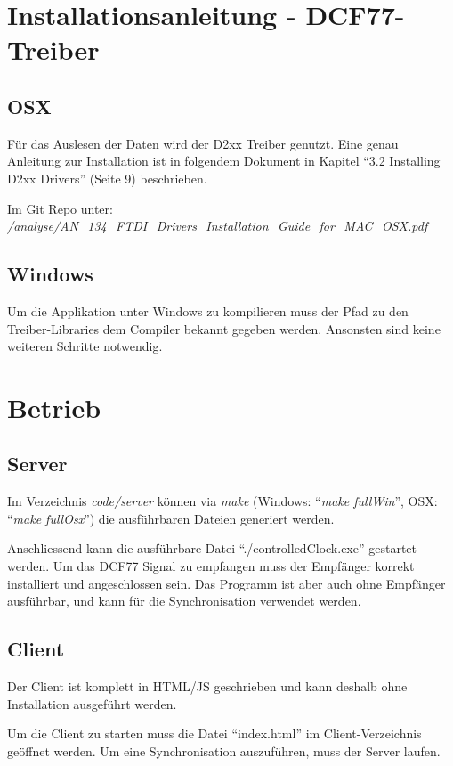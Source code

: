 \section{Installationsanleitung - DCF77-Treiber}
\subsection{OSX}
Für das Auslesen der Daten wird der D2xx Treiber genutzt. Eine genau Anleitung zur Installation ist in folgendem Dokument in Kapitel "`3.2 Installing D2xx Drivers"' (Seite 9) beschrieben.

Im Git Repo unter:\\
\textit{/analyse/AN\_134\_FTDI\_Drivers\_Installation\_Guide\_for\_MAC\_OSX.pdf}

\subsection{Windows}
Um die Applikation unter Windows zu kompilieren muss der Pfad zu den Treiber-Libraries dem Compiler bekannt gegeben werden. Ansonsten sind keine weiteren Schritte notwendig.

\section{Betrieb}
\subsection{Server}
Im Verzeichnis \textit{code/server} können via \textit{make} (Windows: "`\textit{make fullWin}"', OSX: "`\textit{make fullOsx}"') die ausführbaren Dateien generiert werden.

Anschliessend kann die ausführbare Datei "`./controlledClock.exe"' gestartet werden. Um das DCF77 Signal zu empfangen muss der Empfänger korrekt installiert und angeschlossen sein. Das Programm ist aber auch ohne Empfänger ausführbar, und kann für die Synchronisation verwendet werden.

\subsection{Client}
Der Client ist komplett in HTML/JS geschrieben und kann deshalb ohne Installation ausgeführt werden. 

Um die Client zu starten muss die Datei "`index.html"' im Client-Verzeichnis geöffnet werden. Um eine Synchronisation auszuführen, muss der Server laufen.

